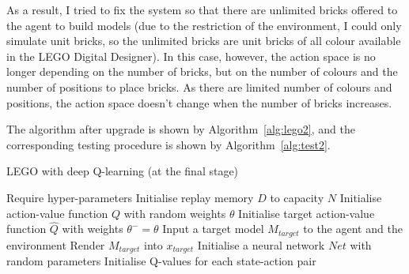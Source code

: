 \documentclass[a4paper]{article}
\begin{document}
        		As a result, I tried to fix the system so that there are unlimited bricks offered to the agent to build models (due to the restriction of the environment, I could only simulate unit bricks, so the unlimited bricks are unit bricks of all colour available in the LEGO Digital Designer). In this case, however, the action space is no longer depending on the number of bricks, but on the number of colours and the number of positions to place bricks. As there are limited number of colours and positions, the action space doesn't change when the number of bricks increases. 
        		
        		The algorithm after upgrade is shown by Algorithm~\ref{alg:lego2}, and the corresponding testing procedure is shown by Algorithm~\ref{alg:test2}.
        		
        		\begin{algorithm}[]
        			\caption{LEGO with deep Q-learning (at the final stage)} \label{alg:lego2}
        			\begin{algorithmic}[1]
        				\State Require hyper-parameters
        				\State Initialise replay memory $D$ to capacity $N$
        				\State Initialise action-value function $Q$ with random weights $\theta$
        				\State Initialise target action-value function $\hat{Q}$ with weights $\theta^- = \theta$
        				\State Input a target model $M_{target}$ to the agent and the environment
        				\State Render $M_{target}$ into $x_{target}$
        				\State Initialise a neural network $Net$ with random parameters
        				\State Initialise Q-values for each state-action pair
        				

\end{algorithmic}
\end{algorithm}
\end{document}
